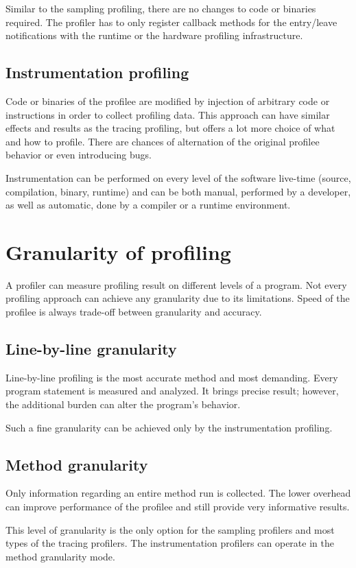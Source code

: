 Similar to the sampling profiling, there are no changes to code or binaries required. The profiler has to only register callback methods for the entry/leave notifications with the runtime or the hardware profiling infrastructure.

\subsection{Instrumentation profiling}
Code or binaries of the profilee are modified by injection of arbitrary code or instructions in order to collect profiling data. This approach can have similar effects and results as the tracing profiling, but offers a lot more choice of what and how to profile. There are chances of alternation of the original profilee behavior or even introducing bugs.

Instrumentation can be performed on every level of the software live-time (source, compilation, binary, runtime) and can be both manual, performed by a developer, as well as automatic, done by a compiler or a runtime environment.

\section{Granularity of profiling}
A profiler can measure profiling result on different levels of a program. Not every profiling approach can achieve any granularity due to its limitations. Speed of the profilee is always trade-off between granularity and accuracy. 

\subsection{Line-by-line granularity}
Line-by-line profiling is the most accurate method and most demanding. Every program statement is measured and analyzed. It brings precise result; however, the additional burden can alter the program's behavior.

Such a fine granularity can be achieved only by the instrumentation profiling.

\subsection{Method granularity} 
Only information regarding an entire method run is collected. The lower overhead can improve performance of the profilee and still provide very informative results.

This level of granularity is the only option for the sampling profilers and most types of the tracing profilers. The instrumentation profilers can operate in the method granularity mode.

